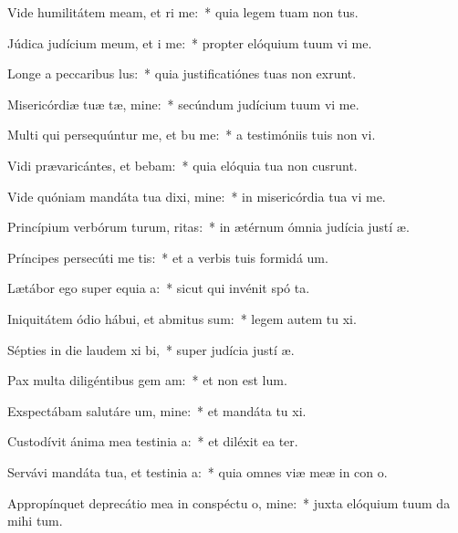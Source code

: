 \item Vide humilitátem meam, et ri me:~* quia legem tuam non  tus.
\item Júdica judícium meum, et i me:~* propter elóquium tuum vi me.
\item Longe a peccaribus lus:~* quia justificatiónes tuas non exrunt.
\item Misericórdiæ tuæ tæ, mine:~* secúndum judícium tuum vi me.
\item Multi qui persequúntur me, et bu me:~* a testimóniis tuis non vi.
\item Vidi prævaricántes, et bebam:~* quia elóquia tua non cusrunt.
\item Vide quóniam mandáta tua dixi, mine:~* in misericórdia tua vi me.
\item Princípium verbórum turum, ritas:~* in ætérnum ómnia judícia justí æ.
\item Príncipes persecúti  me tis:~* et a verbis tuis formidá  um.
\item Lætábor ego super equia a:~* sicut qui invénit spó ta.
\item Iniquitátem ódio hábui, et abmitus sum:~* legem autem tu xi.
\item Sépties in die laudem xi bi,~* super judícia justí æ.
\item Pax multa diligéntibus gem am:~* et non est  lum.
\item Exspectábam salutáre um, mine:~* et mandáta tu xi.
\item Custodívit ánima mea testinia a:~* et diléxit ea ter.
\item Servávi mandáta tua, et testinia a:~* quia omnes viæ meæ in con o.
\item Appropínquet deprecátio mea in conspéctu o, mine:~* juxta elóquium tuum da mihi tum.

